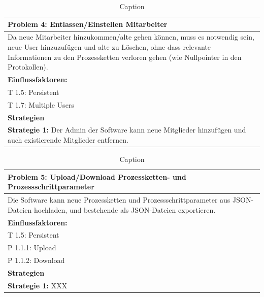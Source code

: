 \documentclass[enabledeprecatedfontcommands,fontsize=12pt,paper=a4,twoside]{scrartcl}
\begin{document}
\begin{table}[H]
    \centering
    \begin{tabular}{|p{15cm}|}
    \hline
          \textbf{Problem 4:} Entlassen/Einstellen Mitarbeiter \\ \hline %
          Da neue Mitarbeiter hinzukommen/alte gehen können, muss es notwendig sein, neue User hinzuzufügen und alte zu Löschen, ohne dass relevante Informationen zu den Prozessketten verloren gehen (wie Nullpointer in den Protokollen).
          \\ \hline
          \textbf{Einflussfaktoren: } \\
          T 1.5: Persistent \\
          T 1.7: Multiple Users\\
          \hline
          \textbf{Strategien} \\ \hline
          \textbf{Strategie 1:} Der Admin der Software kann neue Mitglieder hinzufügen und auch existierende Mitglieder entfernen.
          \\ \hline
    \end{tabular}

    \caption{Caption}
    \label{tab:my_label}
\end{table}

\begin{table}[H]
    \centering
    \begin{tabular}{|p{15cm}|}
    \hline
          \textbf{Problem 5:} Upload/Download Prozessketten- und Prozessschrittparameter \\ \hline
          Die Software kann neue Prozessketten und Prozessschrittparameter aus JSON-Dateien hochladen, und bestehende als JSON-Dateien exportieren.
          \\ \hline
          \textbf{Einflussfaktoren: } \\
          T 1.5: Persistent \\
          P 1.1.1: Upload\\
          P 1.1.2: Download\\
          \hline
          \textbf{Strategien} \\ \hline
          \textbf{Strategie 1:} XXX
          \\ \hline
    \end{tabular}

    \caption{Caption}
    \label{tab:my_label}
\end{table}
\end{document}
